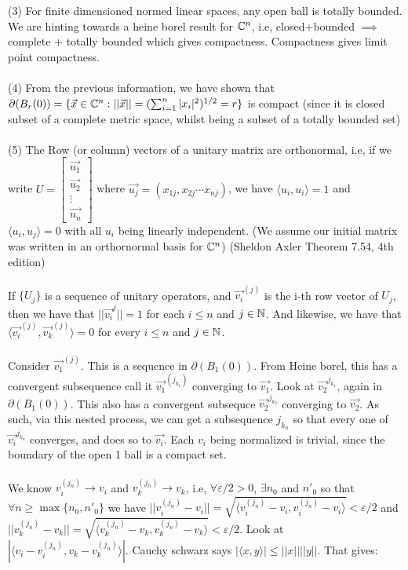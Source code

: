 \documentclass[../Main.tex]{subfiles}
\begin{document}
\\\\ (3) For finite dimensioned normed linear spaces, any open ball is totally bounded. We are hinting towards a heine borel result for $\mathbb C^n$, i.e, closed+bounded $\implies$ complete + totally bounded which gives compactness. Compactness gives limit point compactness. 
\\\\ (4) From the previous information, we have shown that $\partial(B_{r}(0))=\{\vec{x} \in \mathbb C^n: ||\vec{x}||=(\sum_{i=1}^n |x_i|^2)^{1/2}=r\}$ is compact (since it is closed subset of a complete metric space, whilst being a subset of a totally bounded set)
\\\\ (5) The Row (or column) vectors of a unitary matrix are orthonormal, i.e, if we write $U=\begin{bmatrix}
    \vec{u_1} \\ \vec{u_2} \\ \vdots \\ \vec{u_n}
\end{bmatrix}$ where 
$\vec{u_j}=(x_{1j},x_{2j} \cdots x_{nj})$, we have $\langle u_i,u_i \rangle =1 $ and $\langle u_i, u_j \rangle=0$ with all $u_i $ being linearly independent. (We assume our initial matrix was written in an orthornormal basis for $\mathbb C^n$) (Sheldon Axler Theorem 7.54, 4th edition)
\\\\ If $\{U_j\}$ is a sequence of unitary operators, and $\vec{v_i}^{(j)}$ is the i-th row vector of $U_j$, then we have that $||\vec{v_i}^{j}||=1$ for each $i \leq n $ and $j \in \mathbb N$. And likewise, we have that $\langle\vec{v_i}^{(j)},\vec{v_k}^{(j)}\rangle=0$ for every $i \leq n$ and $j \in \mathbb N$. 
\\\\ Consider $\vec{v_1}^{(j)}$. This is a sequence in $\partial(B_{1}(0))$. From Heine borel, this has a convergent subsequence call it $\vec{v_{1}}^{(j_{k_1})}$ converging to $\vec{v_1}$. Look at $\vec{v_2}^{j_{k_1}}$, again in $\partial(B_{1}(0))$. This also has a convergent subsequce $\vec{v_2}^{j_{k_2}}$ converging to $\vec{v_2}$. As such, via this nested process, we can get a subsequence $j_{k_n}$ so that every one of $\vec{v_i}^{j_{k_n}}$ converges, and does so to $\vec{v_i}$. Each $v_i$ being normalized is trivial, since the boundary of the open 1 ball is a compact set. 
\\\\ We know $v_i^{(j_n)}\to v_i$ and $v_k^{(j_n)}\to v_k$, i.e, $\forall \varepsilon/2>0$, $\exists n_0$ and $n'_0$ so that $\forall n \geq \max\{n_0,n'_0\}$ we have $||v_i^{(j_n)}-v_i||=\sqrt{\langle v_i^{(j_n)}-v_i,v_i^{(j_n)}-v_i \rangle} <\varepsilon/2$ and $||v_k^{(j_n)}-v_k||=\sqrt{\langle v_k^{(j_n)}-v_k,v_k^{(j_n)}-v_k \rangle}<\varepsilon/2$. Look at $|\langle v_i-v_i^{(j_n)},v_k-v_k^{(j_n)} \rangle|$. Cauchy schwarz says $|\langle x,y\rangle|\leq ||x||||y||$. That gives:
\end{document}
